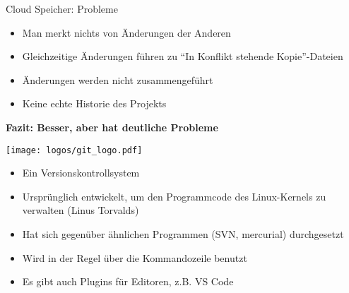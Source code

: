\begin{frame}{Cloud Speicher: Probleme}
  \centering

  \begin{itemize}
    \item Man merkt nichts von Änderungen der Anderen
    \item Gleichzeitige Änderungen führen zu \enquote{In Konflikt stehende Kopie}-Dateien
    \item Änderungen werden nicht zusammengeführt
    \item Keine echte Historie des Projekts
  \end{itemize}
  \textbf{\Large Fazit: Besser, aber hat deutliche Probleme}
\end{frame}


\begin{frame}
    \centering
    \texttt{[image: logos/git\_logo.pdf]}

    \vspace{1em}

    \begin{itemize}
      \item Ein Versionskontrollsystem
      \item Ursprünglich entwickelt, um den Programmcode des Linux-Kernels zu verwalten (Linus Torvalds)
      \item Hat sich gegenüber ähnlichen Programmen (SVN, mercurial) durchgesetzt
      \item Wird in der Regel über die Kommandozeile benutzt
      \item Es gibt auch Plugins für Editoren, z.B. VS Code
    \end{itemize}
\end{frame}

